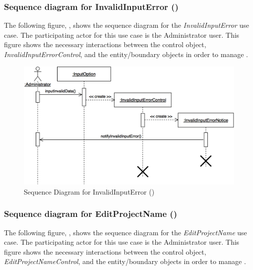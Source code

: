 \documentclass[12pt,letterpaper]{article}
\begin{document}
\subsubsection*{Sequence diagram for InvalidInputError ()}

The following figure, , shows the sequence diagram for the {\it InvalidInputError} use case. The participating actor for this use case is
the Administrator user. This figure shows the necessary interactions between the control object, {\it InvalidInputErrorControl}, and the
entity/boundary objects in order to manage .

\begin{figure}[H]
	\centering{}
	\includegraphics[scale=0.27]{imgs/seq/invalid-input-error.png}
	\caption[ - Sequence Diagram for InvalidInputError]{Sequence Diagram for InvalidInputError ()}
\end{figure}

\subsubsection*{Sequence diagram for EditProjectName ()}

The following figure, , shows the sequence diagram for the {\it EditProjectName} use case. The participating actor for this use case is the Administrator user. This figure shows the necessary interactions between the control object, {\it EditProjectNameControl}, and the
entity/boundary objects in order to manage .
\end{document}
